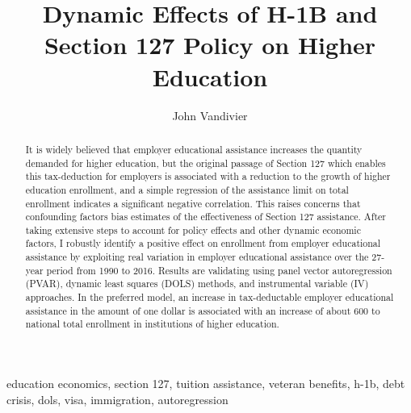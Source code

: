 \documentclass[review]{elsarticle}
\begin{document}
\begin{frontmatter}

\title{
    Dynamic Effects of H-1B and Section 127 Policy on Higher Education
}

\author[mymainaddress]{John Vandivier} %
\address[mymainaddress]{4400 University Dr, Fairfax, VA 22030}

\begin{abstract}
    It is widely believed that employer educational assistance increases the quantity demanded for higher education,
    but the original passage of Section 127 which enables this tax-deduction for employers is associated with a reduction to the growth of higher education enrollment,
    and a simple regression of the assistance limit on total enrollment indicates a significant negative correlation. %
    This raises concerns that confounding factors bias estimates of the effectiveness of Section 127 assistance.
    After taking extensive steps to account for policy effects and other dynamic economic factors,
    I robustly identify a positive effect on enrollment from employer educational assistance
    by exploiting real variation in employer educational assistance over the 27-year period from 1990 to 2016.
    Results are validating using panel vector autoregression (PVAR),
    dynamic least squares (DOLS) methods,
    and instrumental variable (IV) approaches.
    In the preferred model,
    an increase in tax-deductable employer educational assistance
    in the amount of one dollar is associated with
    an increase of about 600 to national total enrollment in institutions of higher education.
\end{abstract}

\begin{keyword}
education economics, section 127, tuition assistance, veteran benefits, h-1b, debt crisis, dols, visa, immigration, autoregression
\MSC[2010] %
\end{keyword}
\end{frontmatter}
\end{document}
